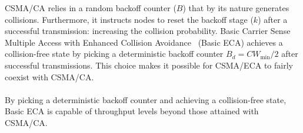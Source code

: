 \documentclass[portrait,a0paper]{baposter}
\begin{document}
\begin{poster}
{CSMA/CA relies in a random backoff counter ($B$) that by its nature generates collisions. Furthermore, it instructs nodes to reset the backoff stage ($k$) after a successful transmission: increasing the collision probability. Basic Carrier Sense Multiple Access with Enhanced Collision Avoidance~\cite{CSMA_ECA} (Basic ECA) achieves a collision-free state by picking a deterministic backoff counter $B_{d}=CW_{\min}/2$ after successful transmissions. This choice makes it possible for CSMA/ECA to fairly coexist with CSMA/CA.
\\\\
By picking a deterministic backoff counter and achieving a collision-free state, Basic ECA is capable of throughput levels beyond those attained with CSMA/CA.

\begin{center}
\end{center}

}
\end{poster}
\end{document}
